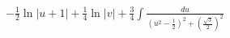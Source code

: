 \documentclass[preview]{standalone}
\begin{document}
\begin{align*}
-\frac{1}{2}\ln|u+1|+\frac{1}{4}\ln|v|+\frac{3}{4}\int\frac{du}{(u^2-\frac{1}{2})^2+(\frac{\sqrt3}{2})^2}
\end{align*}
\end{document}
